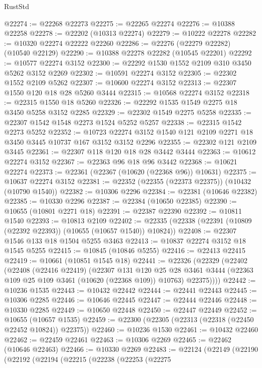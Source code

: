 \begin{lexlean}{RustStd}
\begin{coremodule}
@22274 := @22268 @22273
@22275 := @22265 @22274
@22276 := @10388 @22258
@22278 := @22202 (@10313 @22274)
@22279 := @10222 @22278
@22282 := @10320 @22274 @22222 @22260
@22286 := @22276 (@22279 @22282) (@10540 @22129)
@22290 := @10388 @22278 @22282 (@10545 @22201)
@22292 := @10577 @22274 @3152
@22300 := @22292 @1530 @1552 @2109 @310 @3450 @5262 @3152 @2269
@22302 := @10591 @22274 @3152
@22305 := @22302 @1552 @2109 @5262
@22307 := @10600 @22274 @3152
@22313 := @22307 @1550 @120 @18 @28 @5260 @3444
@22315 := @10568 @22274 @3152
@22318 := @22315 @1550 @18 @5260
@22326 := @22292 @1535 @1549 @2275 @18 @3450 @5258 @3152 @2285
@22329 := @22302 @1549 @2275 @5258
@22335 := @22307 @1542 @1548 @2273 @1524 @5252 @5257
@22338 := @22315 @1542 @2273 @5252
@22352 := @10723 @22274 @3152 @1540 @121 @2109 @2271 @18 @3450 @3445 @10737 @167 @3152 @3152 @2296
@22355 := @22302 @121 @2109 @3445
@22361 := @22307 @118 @120 @18 @28 @3442 @3444
@22363 := @10612 @22274 @3152
@22367 := @22363 @96 @18 @96 @3442
@22368 := @10621 @22274
@22373 := @22361 (@22367 (@10620 (@22368 @96)) @10631)
@22375 := @10637 @22274 @3152
@22381 := @22352 (@22355 (@22373 @22375)) (@10432 (@10790 @1540))
@22382 := @10306 @2296
@22384 := @22381 (@10646 @22382)
@22385 := @10330 @2296
@22387 := @22384 (@10650 @22385)
@22390 := @10655 (@10801 @2271 @18)
@22391 := @22387 @22390
@22392 := @10811 @1540
@22393 := @10813 @2109
@22402 := @22335 (@22338 (@22391 (@10809 (@22392 @22393)) (@10655 (@10657 @1540)) @10824))
@22408 := @22307 @1546 @133 @18 @1504 @5255 @3463
@22413 := @10837 @22274 @3152 @18 @1545 @5255
@22415 := @10845 (@10846 @5255)
@22416 := @22413 @22415
@22419 := @10661 (@10851 @1545 @18)
@22441 := @22326
    (@22329
      (@22402
        (@22408
          (@22416 @22419)
          (@22307
            @131
            @120
            @25
            @28
            @3461
            @3444
            (@22363 @109 @25 @109 @3461 (@10620 (@22368 @109)) @10763)
            @22375))))
@22442 := @10236 @1535
@22443 := @10432 @22442
@22444 := @22441 @22443
@22445 := @10306 @2285
@22446 := @10646 @22445
@22447 := @22444 @22446
@22448 := @10330 @2285
@22449 := @10650 @22448
@22450 := @22447 @22449
@22452 := @10655 (@10657 @1535)
@22459 := @22300 (@22305 (@22313 (@22318 (@22450 @22452 @10824)) @22375))
@22460 := @10236 @1530
@22461 := @10432 @22460
@22462 := @22459 @22461
@22463 := @10306 @2269
@22465 := @22462 (@10646 @22463)
@22466 := @10330 @2269
@22483 := @22124
    (@22149
      (@22190
        (@22192
          (@22194
            (@22215
              (@22238
                (@22253
                  (@22275

\end{coremodule}
\end{lexlean}
